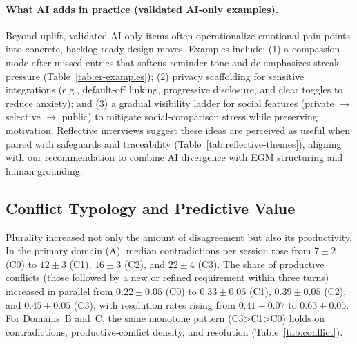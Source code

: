 \documentclass[acmsmall]{acmart}
\begin{document}
\paragraph{What AI adds in practice (validated AI‑only examples).}
Beyond uplift, validated AI‑only items often operationalize emotional pain points into concrete, backlog-ready design moves. Examples include: (1) a compassion mode after missed entries that softens reminder tone and de‑emphasizes streak pressure (Table~\ref{tab:er-examples}); (2) privacy scaffolding for sensitive integrations (e.g., default‑off linking, progressive disclosure, and clear toggles to reduce anxiety); and (3) a gradual visibility ladder for social features (private $\rightarrow$ selective $\rightarrow$ public) to mitigate social-comparison stress while preserving motivation. Reflective interviews suggest these ideas are perceived as useful when paired with safeguards and traceability (Table~\ref{tab:reflective-themes}), aligning with our recommendation to combine AI divergence with EGM structuring and human grounding.


\subsection{Conflict Typology and Predictive Value}
Plurality increased not only the amount of disagreement but also its productivity. In the primary domain (A), median contradictions per session rose from \(7{\pm}2\) (C0) to \(12{\pm}3\) (C1), \(16{\pm}3\) (C2), and \(22{\pm}4\) (C3). The share of productive conflicts (those followed by a new or refined requirement within three turns) increased in parallel from \(0.22{\pm}0.05\) (C0) to \(0.33{\pm}0.06\) (C1), \(0.39{\pm}0.05\) (C2), and \(0.45{\pm}0.05\) (C3), with resolution rates rising from \(0.41{\pm}0.07\) to \(0.63{\pm}0.05\). For Domains~B and~C, the same monotone pattern (C3\textgreater{}C1\textgreater{}C0) holds on contradictions, productive‑conflict density, and resolution (Table~\ref{tab:conflict}).
\end{document}
